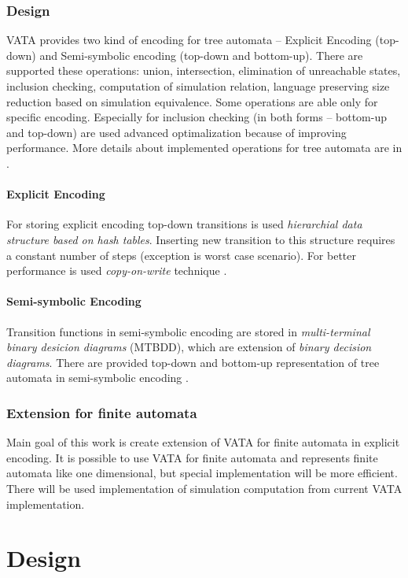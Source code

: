 \subsection{Design}
VATA provides two kind of encoding for tree automata -- Explicit Encoding (top-down) and Semi-symbolic encoding (top-down and bottom-up). There are supported
these operations: union, intersection, elimination of unreachable states, inclusion checking, computation of simulation relation, language preserving size
reduction based on simulation equivalence. Some operations are able only for specific encoding. Especially for inclusion checking (in both forms -- bottom-up and
top-down) are used advanced optimalization because of improving performance.
More details about implemented operations for tree automata are in \cite{libvata}.
\subsubsection{Explicit Encoding}
For storing explicit encoding top-down transitions is used \emph{hierarchial data structure based on hash tables}. Inserting new transition to this structure 
requires a constant number of steps (exception is worst case scenario). For better performance is used \emph{copy-on-write} technique \cite{libvata}.
\subsubsection{Semi-symbolic Encoding}
Transition functions in semi-symbolic encoding are stored in \emph{multi-terminal binary desicion diagrams} (MTBDD), which are extension of \emph{binary decision 
diagrams}. There are provided top-down and bottom-up representation of tree automata in semi-symbolic encoding \cite{libvata}.
\subsection{Extension for finite automata}
Main goal of this work is create extension of VATA for finite automata in explicit encoding. It is possible to use VATA for finite automata and represents
finite automata like one dimensional, but special implementation will be more efficient. %
There will be used implementation of simulation computation from current VATA implementation. %

\chapter{Design}
\label{arch}

